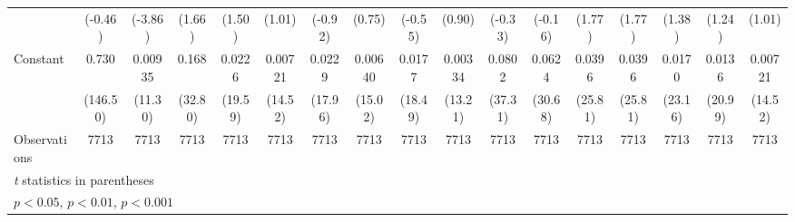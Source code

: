 \begin{table}[htbp]
\begin{tabular}{l*{16}{c}}
                    &     (-0.46)         &     (-3.86)         &      (1.66)         &      (1.50)         &      (1.01)         &     (-0.92)         &      (0.75)         &     (-0.55)         &      (0.90)         &     (-0.33)         &     (-0.16)         &      (1.77)         &      (1.77)         &      (1.38)         &      (1.24)         &      (1.01)         \\
\addlinespace
Constant            &       0.730\sym{***}&     0.00935\sym{***}&       0.168\sym{***}&      0.0226\sym{***}&     0.00721\sym{***}&      0.0229\sym{***}&     0.00640\sym{***}&      0.0177\sym{***}&     0.00334\sym{***}&      0.0802\sym{***}&      0.0624\sym{***}&      0.0396\sym{***}&      0.0396\sym{***}&      0.0170\sym{***}&      0.0136\sym{***}&     0.00721\sym{***}\\
                    &    (146.50)         &     (11.30)         &     (32.80)         &     (19.59)         &     (14.52)         &     (17.96)         &     (15.02)         &     (18.49)         &     (13.21)         &     (37.31)         &     (30.68)         &     (25.81)         &     (25.81)         &     (23.16)         &     (20.99)         &     (14.52)         \\
\midrule
Observations        &        7713         &        7713         &        7713         &        7713         &        7713         &        7713         &        7713         &        7713         &        7713         &        7713         &        7713         &        7713         &        7713         &        7713         &        7713         &        7713         \\
\bottomrule
\multicolumn{17}{l}{\footnotesize \textit{t} statistics in parentheses}\\
\multicolumn{17}{l}{\footnotesize \sym{*} \(p<0.05\), \sym{**} \(p<0.01\), \sym{***} \(p<0.001\)}\\
\end{tabular}
\end{table}
